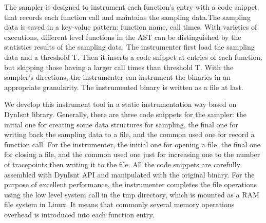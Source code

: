 The sampler is designed to instrument each function’s entry with a code snippet that records each function call and maintains the sampling data.The sampling data is saved in a key-value pattern: function name, call times. With varieties of executions, different level functions in the AST can be distinguished by the statistics results of the sampling data. The instrumenter first load the sampling data and a threshold T. Then it inserts a code snippet at entries of each function, but skipping those having a larger call times than threshold T. With the sampler’s directions, the instrumenter can instrument the binaries in an appropriate granularity. The instrumented binary is written as a file at last. 

We develop this instrument tool in a static instrumentation way based on DynIsnt library. Generally, there are three code snippets for the sampler: the initial one for creating some data structures for sampling, the final one for writing back the sampling data to a file, and the common used one for record a function call. For the instrumenter, the initial one for opening a file, the final one for closing a file, and the common used one just for increasing one to the number of tracepoints then writing it to the file. All the code snippets are carefully assembled with DynIsnt API and manipulated with the original binary. For the purpose of excellent performance, the instrumenter completes the file operations using the low level system call in the tmp directory, which is mounted as a RAM file system in Linux. It means that commonly several memory operations overhead is introduced into each function entry.